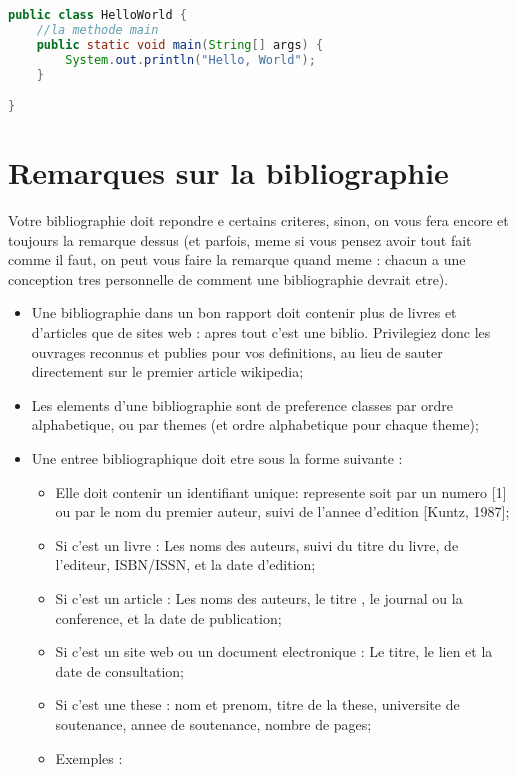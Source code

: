\begin{spacing}{1.2}
\begin{lstlisting}[label=code:java,caption=Helloworld Java,language=java]
	public class HelloWorld {
	//la methode main
    public static void main(String[] args) {
        System.out.println("Hello, World");
    }

}
\end{lstlisting}

\section{Remarques sur la bibliographie}
Votre bibliographie doit repondre e certains criteres, sinon, on vous fera encore et
toujours la remarque dessus (et parfois, meme si vous pensez avoir tout fait comme il
 faut, on peut vous faire la remarque quand meme : chacun a une conception tres
personnelle de comment une bibliographie devrait etre).\\
\begin{itemize}
\item Une bibliographie dans un bon rapport doit contenir plus de livres et d'articles 
que de sites web : apres tout c'est une biblio. Privilegiez donc les ouvrages
reconnus et publies pour vos definitions, au lieu de sauter directement sur le premier article wikipedia;
 \item Les elements d'une bibliographie sont de preference classes par ordre
alphabetique, ou par themes (et ordre alphabetique pour chaque theme);
\item Une entree bibliographique doit etre sous la forme suivante :
\begin{itemize}
\item Elle doit contenir un identifiant unique: represente soit par un numero
[1] ou par le nom du premier auteur, suivi de l'annee d'edition [Kuntz, 1987];
\item Si c'est un livre : Les noms des auteurs, suivi du titre du livre, de l'editeur, 
ISBN/ISSN, et la date d'edition;
\item Si c'est un article : Les noms des auteurs, le titre , le journal ou la
conference, et la date de publication;
\item Si c'est un site web ou un document electronique : Le titre, le lien et la date 
de consultation;
\item Si c'est une these : nom et prenom, titre de la these, universite de
soutenance, annee de soutenance, nombre de pages;
\item Exemples : 
\begin{description}

\end{description}
\end{itemize}
\end{itemize}
\end{spacing}
